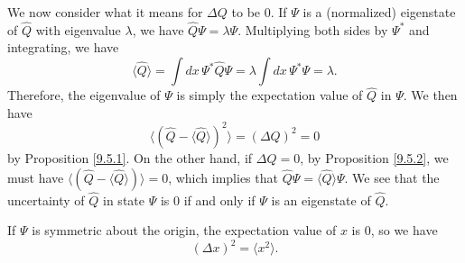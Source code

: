 We now consider what it means for $\Delta Q$ to be $0$. If $\Psi$ is a (normalized) eigenstate of $\hat{Q}$ with eigenvalue $\lambda$, we have $\hat{Q}\Psi=\lambda\Psi$. Multiplying both sides by $\Psi^*$ and integrating, we have $$\langle\hat{Q}\rangle=\int dx\,\Psi^*\hat{Q}\Psi=\lambda\int dx\,\Psi^*\Psi=\lambda.$$Therefore, the eigenvalue of $\Psi$ is simply the expectation value of $\hat{Q}$ in $\Psi$. We then have $$\langle(\hat{Q}-\langle\hat{Q}\rangle)^2\rangle=(\Delta Q)^2=0$$by Proposition \ref{9.5.1}. On the other hand, if $\Delta Q = 0$, by Proposition \ref{9.5.2}, we must have $\langle(\hat{Q}-\langle\hat{Q}\rangle)\rangle=0$, which implies that $\hat{Q}\Psi=\langle\hat{Q}\rangle\Psi$. We see that the uncertainty of $\hat{Q}$ in state $\Psi$ is $0$ if and only if $\Psi$ is an eigenstate of $\hat{Q}$.

\begin{framedrmk*}
    If $\Psi$ is symmetric about the origin, the expectation value of $x$ is $0$, so we have $$(\Delta x)^2=\langle x^2\rangle.$$
\end{framedrmk*}
